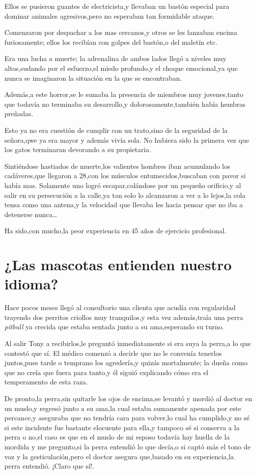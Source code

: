 \documentclass[letterpaper,12pt]{book}
\begin{document}
Ellos se pusieron guantes de electricista,y llevaban un bastón especial para dominar animales agresivos,pero no esperaban tan formidable ataque.

Comenzaron por despachar a los mas cercanos,y otros se les lanzaban encima furiosamente; ellos los recibían con golpes del bastón,o del maletín etc.

Era una lucha a muerte; la adrenalina de ambos lados llegó a niveles muy altos,sudando por el esfuerzo,el miedo profundo,y el choque emocional,ya que nunca se imaginaron la situación en la que se encontraban.

Además,a este horror,se le sumaba la presencia de miembros muy jovenes,tanto que todavía no terminaba su desarrollo,y dolorosamente,también había hembras preñadas.

Esto ya no era cuestión de cumplir con un trato,sino de la seguridad de la señora,qwe ya era mayor y además vivía sola. No hubiera sido la primera vez que los gatos terminaran devorando a su propietaria.

Sintiéndose hastiados de muerte,los valientes hombres iban acumulando los cadáveres,que llegaron a 28,con los músculos entumecidos,buscaban con pavor si había mas. Solamente uno logró escapar,colándose por un pequeño orificio,y al salir en su persecución a la calle,ya tan solo lo alcanzaron a ver a lo lejos,la cola tensa como una antena,y la velocidad que llevaba les hacia pensar que no iba a detenerse nunca\ldots

Ha sido,con mucho,la peor experiencia en 45 años de ejercicio profesional.

\chapter{¿Las mascotas entienden nuestro idioma?}
Hace pocos meses llegó al consultorio una clienta que acudía con regularidad trayendo dos perritos criollos muy tranquilos,y esta vez además,traía una perra {\it pitbull}\/ ya crecida que estaba sentada junto a su ama,esperando su turno.

Al salir Tony a recibirlos,le preguntó inmediatamente si era suya la perra,a lo que contestó que sí. El médico comenzó a decirle que no le convenía tenerlos juntos,pues tarde o temprano los agredería,y quizás mortalmente; la dueña como que no creía que fuera para tanto,y él siguió explicando cómo era el temperamento de esta raza.

De pronto,la perra,sin quitarle los ojos de encima,se levantó y mordió al doctor en un muslo,y regresó junto a su ama,la cual estaba sumamente apenada por este percance,y aseguraba que no tendría cara para volver,lo cual ha cumplido,y no sé si este incidente fue bastante elocuente para ella,y tampoco sé si conserva a la perra o no,el caso es que en el muslo de mi esposo todavía hay huella de la mordida y me pregunto,si la perra entendió lo que decía,o si captó más el tono de voz y la gesticulación,pero el doctor asegura que,basado en su experiencia,la perra entendió. ¡Claro que sí!.
\end{document}
